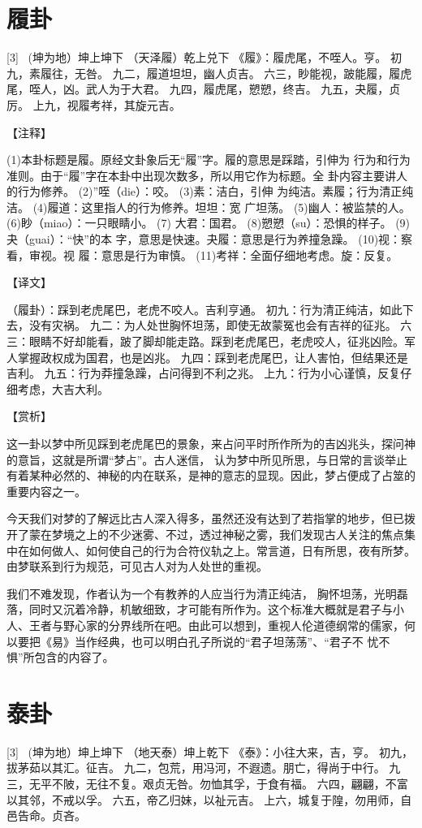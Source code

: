 \documentclass[12pt,UTF8]{ctexbook}
\begin{document}
\chapter{履卦}
[3] \ (坤为地）坤上坤下
（天泽履）乾上兑下
《履》：履虎尾，不咥人。亨。
初九，素履往，无咎。
九二，履道坦坦，幽人贞吉。
六三，眇能视，跛能履，履虎尾，咥人，凶。武人为于大君。
九四，履虎尾，愬愬，终吉。
九五，夬履，贞厉。
上九，视履考祥，其旋元吉。

【注释】

(1)本卦标题是履。原经文卦象后无“履”字。履的意思是踩踏，引伸为 行为和行为准则。由于“履”字在本卦中出现次数多，所以用它作为标题。全 卦内容主要讲人的行为修养。
(2)”咥（die）：咬。
(3)素：洁白，引伸 为纯洁。素履；行为清正纯洁。
(4)履道：这里指人的行为修养。坦坦：宽 广坦荡。
(5)幽人：被监禁的人。
(6)眇（miao）：一只眼睛小。
(7) 大君：国君。
(8)愬愬（su）：恐惧的样子。
(9)夬（guai）：“快”的本 字，意思是快速。夬履：意思是行为养撞急躁。
(10)视：察看，审视。视 履：意思是行为审慎。
(11)考祥：全面仔细地考虑。旋：反复。

【译文】

（履卦）：踩到老虎尾巴，老虎不咬人。吉利亨通。
初九：行为清正纯洁，如此下去，没有灾祸。
九二：为人处世胸怀坦荡，即使无故蒙冤也会有吉祥的征兆。
六三：眼睛不好却能看，跛了脚却能走路。踩到老虎尾巴，老虎咬人，征兆凶险。军人掌握政权成为国君，也是凶兆。
九四：踩到老虎尾巴，让人害怕，但结果还是吉利。
九五：行为莽撞急躁，占问得到不利之兆。
上九：行为小心谨慎，反复仔细考虑，大吉大利。

【赏析】

这一卦以梦中所见踩到老虎尾巴的景象，来占问平时所作所为的吉凶兆头，探问神的意旨，这就是所谓“梦占”。古人迷信， 认为梦中所见所思，与日常的言谈举止有着某种必然的、神秘的内在联系，是神的意志的显现。因此，梦占便成了占筮的重要内容之一。

今天我们对梦的了解远比古人深入得多，虽然还没有达到了若指掌的地步，但已拨开了蒙在梦境之上的不少迷雾、不过，透过神秘之雾，我们发现古人关注的焦点集中在如何做人、如何使自己的行为合符仪轨之上。常言道，日有所思，夜有所梦。由梦联系到行为规范，可见古人对为人处世的重视。

我们不难发现，作者认为一个有教养的人应当行为清正纯洁， 胸怀坦荡，光明磊落，同时又沉着冷静，机敏细致，才可能有所作为。这个标准大概就是君子与小人、王者与野心家的分界线所在吧。由此可以想到，重视人伦道德纲常的儒家，何以要把《易》当作经典，也可以明白孔子所说的“君子坦荡荡”、“君子不 忧不惧”所包含的内容了。

\chapter{泰卦}
[3] \ (坤为地）坤上坤下
（地天泰）坤上乾下
《泰》：小往大来，吉，亨。
初九，拔茅茹以其汇。征吉。
九二，包荒，用冯河，不遐遗。朋亡，得尚于中行。
九三，无平不陂，无往不复。艰贞无咎。勿恤其孚，于食有福。
六四，翩翩，不富以其邻，不戒以孚。
六五，帝乙归妹，以祉元吉。
上六，城复于隍，勿用师，自邑告命。贞吝。
\end{document}
